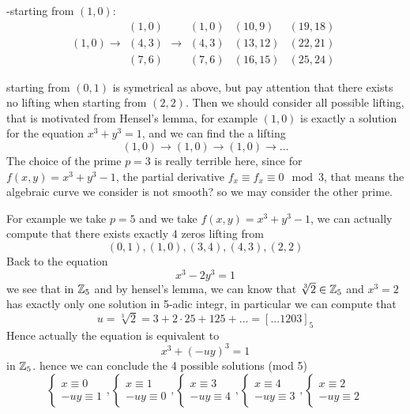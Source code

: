     -starting from \((1,0)\):
    \[(1,0) \rightarrow \begin{matrix}
        (1,0) \\
        (4,3) \\
        (7,6)
    \end{matrix} \rightarrow
    \begin{matrix}
        (1,0) & (10,9) & (19,18) \\
        (4,3) & (13,12) & (22,21) \\
        (7,6) & (16,15) & (25,24)
    \end{matrix}\]

    starting from \((0,1)\) is symetrical as above, but pay attention that there exists no lifting when starting from \((2,2)\). Then we should consider all possible lifting, that is motivated from Hensel's lemma, for example \((1,0)\) is exactly a solution for the equation \(x^3+y^3=1\), and we can find the a lifting
    \[(1,0) \rightarrow (1,0) \rightarrow (1,0) \rightarrow ...\]
    The choice of the prime \(p=3\) is really terrible here, since for \(f(x,y) = x^3+y^3-1\), the partial derivative \(f_x \equiv f_x \equiv 0 \mod 3\), that means the algebraic curve we consider is not smooth? so we may consider the other prime.

    For example we take \(p=5\) and we take \(f(x,y)=x^3+y^3-1\), we can actually compute that there exists exactly 4 zeros lifting from
    \[(0,1),(1,0),(3,4),(4,3),(2,2)\]
    Back to the equation \[x^3-2y^3=1\] we see that in \(\mathbb{Z}_5\) and by hensel's lemma, we can know that \(\sqrt[3]{2} \in \mathbb{Z}_5\) and \(x^3=2\) has exactly only one solution in 5-adic integr, in particular we can compute that
    \[u = \sqrt[3]{2} = 3+2\cdot25+125+... = [...1203]_5\]
    Hence actually the equation is equivalent to
    \[x^3+(-uy)^3= 1\]
    in \(\mathbb{Z}_5\). hence we can conclude the 4 possible solutions (mod 5)
    \[\begin{cases}
        x \equiv 0\\
        -uy \equiv 1
    \end{cases},\begin{cases}
        x \equiv 1\\
        -uy \equiv 0
    \end{cases},\begin{cases}
        x \equiv 3\\
        -uy \equiv 4
    \end{cases},\begin{cases}
        x \equiv 4\\
        -uy \equiv 3
    \end{cases},\begin{cases}
        x \equiv 2\\
        -uy \equiv 2
    \end{cases}\]

